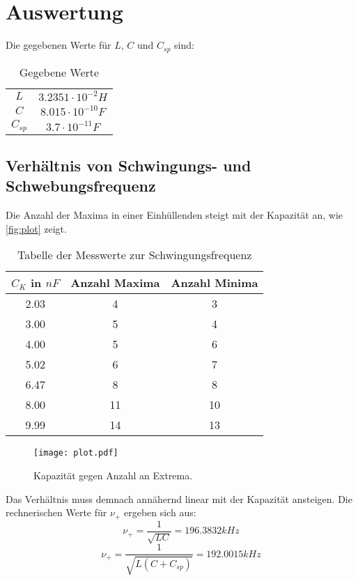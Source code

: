 \newpage
\section{Auswertung}
\label{sec:Auswertung}

Die gegebenen Werte für \(L\), \(C\) und \(C_{sp}\) sind:
\begin{table}
  \centering
  \caption{Gegebene Werte}
  \label{tab:tab}
  \begin{tabular}{c c}
    \midrule
    \(L\) & \(3.2351\cdot10^{-2} H\)\\
    \(C\) & \(8.015\cdot10^{-10} F\)\\
    \(C_{sp}\) & \(3.7\cdot10^{-11} F\)\\
    \bottomrule
  \end{tabular}
\end{table}

\subsection{Verhältnis von Schwingungs- und Schwebungsfrequenz}
Die Anzahl der Maxima in einer Einhüllenden steigt mit der Kapazität an, wie \autoref{fig:plot} zeigt.
\begin{table}
  \centering
  \caption{Tabelle der Messwerte zur Schwingungsfrequenz}
  \label{tab:tab1}
  \begin{tabular}{c c c}
    \toprule
    \(C_K\) in $nF$ & Anzahl Maxima & Anzahl Minima\\
    \midrule
    2.03 & 4 & 3\\
    3.00 & 5 & 4\\
    4.00 & 5 & 6\\
    5.02 & 6 & 7\\
    6.47 & 8 & 8\\
    8.00 & 11 & 10\\
    9.99 & 14 & 13\\
    \bottomrule
  \end{tabular}
\end{table}

\begin{figure}
  \centering
  \texttt{[image: plot.pdf]}
  \caption{Kapazität gegen Anzahl an Extrema.}
  \label{fig:plot}
\end{figure}
\newpage
Das Verhältnis muss demnach annähernd linear mit der Kapazität ansteigen.
Die rechnerischen Werte für \(\nu_+\) ergeben sich aus:
\begin{equation}
  \nu_+ = \frac{1}{\sqrt{LC}} = 196.3832kHz
\end{equation}
\begin{equation}
  \nu_+ = \frac{1}{\sqrt{L(C+C_{sp})}} = 192.0015kHz
\end{equation}
\newpage
